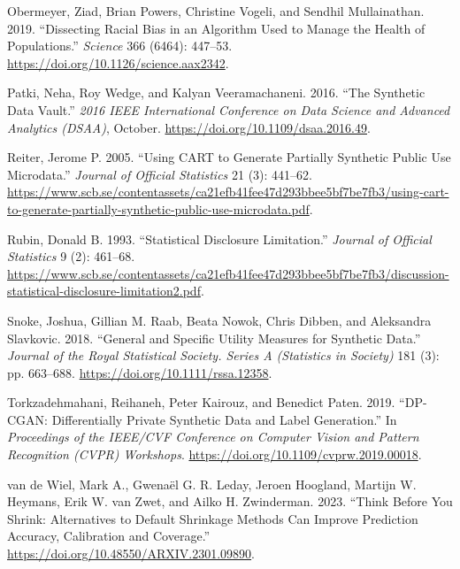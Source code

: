 \documentclass[
]{article}
\newlength{\cslhangindent}
\newlength{\cslentryspacingunit} %
\newenvironment{CSLReferences}[2] %
 {%
  \setlength{\parindent}{0pt}
  \ifodd #1
  \let\oldpar\par
  \def\par{\hangindent=\cslhangindent\oldpar}
  \fi
  \setlength{\parskip}{#2\cslentryspacingunit}
 }%
 {}
\begin{document}
\begin{CSLReferences}{1}{0}
\leavevmode{}%
Obermeyer, Ziad, Brian Powers, Christine Vogeli, and Sendhil
Mullainathan. 2019. {``Dissecting Racial Bias in an Algorithm Used to
Manage the Health of Populations.''} \emph{Science} 366 (6464): 447--53.
\url{https://doi.org/10.1126/science.aax2342}.

\leavevmode{}%
Patki, Neha, Roy Wedge, and Kalyan Veeramachaneni. 2016. {``The
Synthetic Data Vault.''} \emph{2016 IEEE International Conference on
Data Science and Advanced Analytics (DSAA)}, October.
\url{https://doi.org/10.1109/dsaa.2016.49}.

\leavevmode{}%
Reiter, Jerome P. 2005. {``Using CART to Generate Partially Synthetic
Public Use Microdata.''} \emph{Journal of Official Statistics} 21 (3):
441--62.
\url{https://www.scb.se/contentassets/ca21efb41fee47d293bbee5bf7be7fb3/using-cart-to-generate-partially-synthetic-public-use-microdata.pdf}.

\leavevmode{}%
Rubin, Donald B. 1993. {``Statistical Disclosure Limitation.''}
\emph{Journal of Official Statistics} 9 (2): 461--68.
\url{https://www.scb.se/contentassets/ca21efb41fee47d293bbee5bf7be7fb3/discussion-statistical-disclosure-limitation2.pdf}.

\leavevmode{}%
Snoke, Joshua, Gillian M. Raab, Beata Nowok, Chris Dibben, and
Aleksandra Slavkovic. 2018. {``General and Specific Utility Measures for
Synthetic Data.''} \emph{Journal of the Royal Statistical Society.
Series A (Statistics in Society)} 181 (3): pp. 663--688.
\url{https://doi.org/10.1111/rssa.12358}.

\leavevmode{}%
Torkzadehmahani, Reihaneh, Peter Kairouz, and Benedict Paten. 2019.
{``{DP-CGAN}: Differentially Private Synthetic Data and Label
Generation.''} In \emph{Proceedings of the IEEE/CVF Conference on
Computer Vision and Pattern Recognition (CVPR) Workshops}.
\url{https://doi.org/10.1109/cvprw.2019.00018}.

\leavevmode{}%
van de Wiel, Mark A., Gwenaël G. R. Leday, Jeroen Hoogland, Martijn W.
Heymans, Erik W. van Zwet, and Ailko H. Zwinderman. 2023. {``Think
Before You Shrink: Alternatives to Default Shrinkage Methods Can Improve
Prediction Accuracy, Calibration and Coverage.''}
\url{https://doi.org/10.48550/ARXIV.2301.09890}.


\end{CSLReferences}
\end{document}
